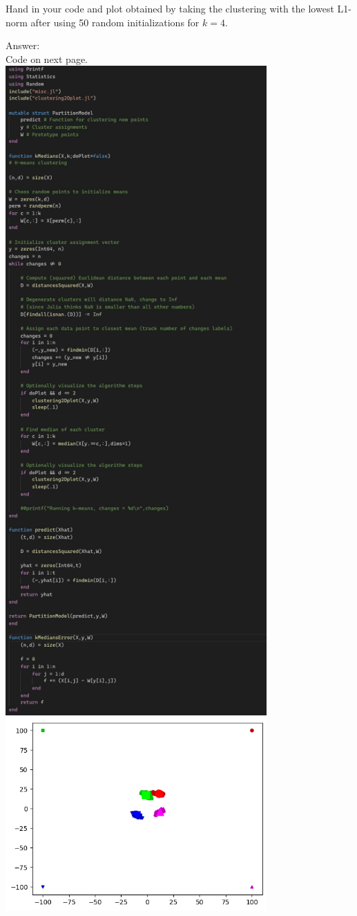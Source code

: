 \documentclass{article}
\def\ans#1{\par\gre{Answer: #1}}
\def\gre#1{{\color{gre}#1}}
\begin{document}
{{\[\] 
 Hand in your code and plot obtained by taking the clustering with the lowest L1-norm after using  50 random initializations for $k = 4$.
\ans{\\Code on next page. \\ \includegraphics[width = 10cm]{q13Code.png} \\ \includegraphics[width=10cm]{q13Graph.png}}
}}
\end{document}
